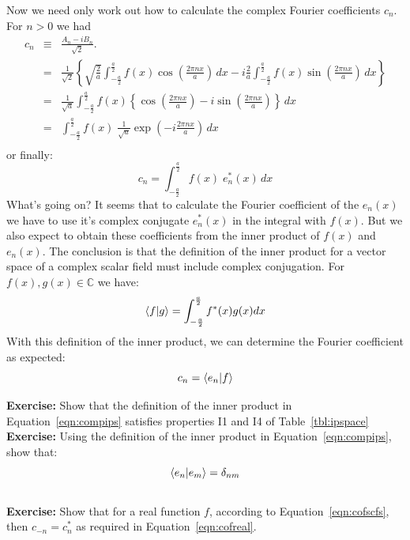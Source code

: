 \documentclass[12pt]{book}
\begin{document}
Now we need only work out how to calculate the complex Fourier coefficients $c_n$. For $n>0$ we had
\begin{eqnarray*}
c_n &\equiv& \frac{A_n - i B_n}{\sqrt{2}}. \\
&=& \frac{1}{\sqrt{2}} \left\{ 
\sqrt{\frac{2}{a}} \int_{-\frac{a}{2}}^{\frac{a}{2}}  f(x) \cos\left( \frac{2\pi n x}{a}\right) \, dx
-i \frac{2}{a} \int_{-\frac{a}{2}}^{\frac{a}{2}}  f(x) \sin\left(\frac{2\pi n x}{a}\right) \, dx
\right\} \\
&=& \frac{1}{\sqrt{a}} \int_{-\frac{a}{2}}^{\frac{a}{2}}  f(x) \left\{\cos\left( \frac{2\pi n x}{a}\right) - i \sin\left( \frac{2\pi n x}{a}\right)\right\} \, dx \\
 &=& \int_{-\frac{a}{2}}^{\frac{a}{2}}  f(x) \; \frac{1}{\sqrt{a}}\exp\left(-i \frac{2\pi n x}{a}\right) \, dx \\
\end{eqnarray*}
or finally:
\begin{equation*}
c_n = \int_{-\frac{a}{2}}^{\frac{a}{2}}  f(x) \; e_n^*(x) \, dx 
\end{equation*}
What's going on?  It seems that to calculate the Fourier coefficient of the $e_n(x)$ we have to use it's complex conjugate $e_n^*(x)$ in the integral with $f(x)$. But we also expect to obtain these coefficients from the inner product of $f(x)$ and $e_n(x)$.  The conclusion is that the definition of the inner product for a vector space of a complex scalar field must include complex conjugation.  For $f(x), g(x) \in \mathbb{C}$ we have:
\begin{equation}
\label{eqn:compips}
\braket{f|g} = \int_{-\frac{a}{2}}^{\frac{a}{2}} f^*(x) g(x) dx
\end{equation}
With this definition of the inner product, we can determine the Fourier coefficient as expected:
\begin{equation}
\label{eqn:cofscfs}
c_n = \braket{e_n|f}
\end{equation}

\noindent
{\bf Exercise:} Show that the definition of the inner product in Equation~\ref{eqn:compips} satisfies properties I1 and I4 of Table~\ref{tbl:ipspace}\\

\noindent
{\bf Exercise:} Using the definition of the inner product in Equation~\ref{eqn:compips}, show that:
$$\braket{e_n|e_m} = \delta_{nm}$$\\

\noindent
{\bf Exercise:} Show that for a real function $f$, according to Equation~\ref{eqn:cofscfs}, then
$c_{-n} = c_{n}^*$ as required in Equation~\ref{eqn:cofreal}.\\  
\end{document}
